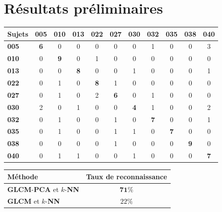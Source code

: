 \documentclass[12pt,twoside,letterpaper]{article}
\begin{document}
\section{Résultats préliminaires}
		\begin{center}
			\vspace{0.3em}
			{ \fontsize{12}{12}\selectfont  	
				\begin{tabular}{l|c|c|c|c|c|c|c|c|c|c}
				Sujets & \textbf{005} & \textbf{010} & \textbf{013} & \textbf{022} & \textbf{027} & \textbf{030} & \textbf{032} & 						\textbf{035} & \textbf{038} & \textbf{040} \\ \hline
				\textbf{005} & \textbf{6} & 0 & 0 & 0 & 0 & 0 & 1 & 0 & 0 & 3 \\ \hline
				\textbf{010} & 0 & \textbf{9} & 0 & 1 & 0 & 0 & 0 & 0 & 0 & 0 \\ \hline
				\textbf{013} & 0 & 0 & \textbf{8} & 0 & 0 & 1 & 0 & 0 & 0 & 1 \\ \hline
				\textbf{022} & 0 & 1 & 0 & \textbf{8} & 1 & 0 & 0 & 0 & 0 & 0 \\ \hline
				\textbf{027} & 0 & 1 & 0 & 2 & \textbf{6} & 0 & 1 & 0 & 0 & 0 \\ \hline
				\textbf{030} & 2 & 0 & 1 & 0 & 0 & \textbf{4} & 1 & 0 & 0 & 2 \\ \hline
				\textbf{032} & 0 & 1 & 0 & 0 & 1 & 0 & \textbf{7} & 0 & 0 & 1 \\ \hline
				\textbf{035} & 0 & 1 & 0 & 0 & 1 & 1 & 0 & \textbf{7} & 0 & 0 \\ \hline
				\textbf{038} & 0 & 0 & 0 & 0 & 1 & 0 & 0 & 0 & \textbf{9} & 0 \\ \hline
				\textbf{040} & 0 & 1 & 1 & 0 & 0 & 1 & 0 & 0 & 0 & \textbf{7} \\ \hline
				\end{tabular}
			}
		\end{center}
		
	 \begin{center}
		\vspace{0.3em}
		{ \fontsize{12}{12}\selectfont 
    	\begin{tabular}{l|c}
        	Méthode 	& Taux de reconnaissance \\ \hline
            \textbf{GLCM}-\textbf{PCA} et $k$-\textbf{NN}   & $\mathbf{71\%}$ \\ \hline
            \textbf{GLCM} et $k$-\textbf{NN}     			& $22\%$ \\ \hline
    	\end{tabular}     		
    	}
    \end{center}
\end{document}
